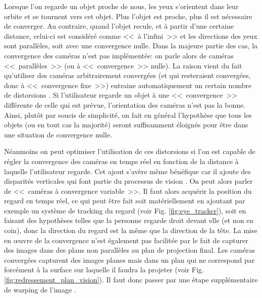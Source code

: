 	\par Lorsque l'on regarde un objet proche de nous, les yeux s'orientent dans leur orbite et se tournent vers cet objet. Plus l'objet est proche, plus il est nécessaire de converger. Au contraire, quand l'objet recule, et à partir d'une certaine distance, celui-ci est considéré comme <<~à l'infini~>> et les directions des yeux sont parallèles, soit avec une convergence nulle. Dans la majeure partie des cas, la convergence des caméras n'est pas implémentée: on parle alors de caméras <<~parallèles~>> (ou à <<~convergence~>> nulle). La raison vient du fait qu'utiliser des caméras arbitrairement convergées (et qui resteraient convergées, donc à <<~convergence fixe~>>) entraine automatiquement un certain nombre de distorsions \citep{woods_image_1993}. Si l'utilisateur regarde un objet à une <<~convergence~>> différente de celle qui est prévue, l'orientation des caméras n'est pas la bonne. Ainsi, plutôt par soucis de simplicité, on fait en général l'hypothèse que tous les objets (ou en tout cas la majorité) seront suffisamment éloignés pour être dans une situation de convergence nulle.
	
	\par Néanmoins on peut optimiser l'utilisation de ces distorsions si l'on est capable de régler la convergence des caméras en temps réel en fonction de la distance à laquelle l'utilisateur regarde. Cet ajout s'avère même bénéfique car il ajoute des disparités verticales qui font partie du processus de vision \citep{aurat_immersion_2016}. On peut alors parler de <<~caméras à convergence variable~>>. Il faut alors acquérir la position du regard en temps réel, ce qui peut être fait soit matériellement en ajoutant par exemple un système de tracking du regard (voir Fig. \ref{fig:eye_tracker}), soit en faisant des hypothèses telles que la personne regarde droit devant elle (et non en coin), donc la direction du regard est la même que la direction de la tête. La mise en œuvre de la convergence n'est également pas facilitée par le fait de capturer des images dans des plans non parallèles au plan de projection final. Les caméras convergées capturent des images planes mais dans un plan qui ne correspond par forcément à la surface sur laquelle il faudra la projeter (voir Fig. \ref{fig:redressement_plan_vision}). Il faut donc passer par une étape supplémentaire de warping de l'image \citep{aurat_immersion_2016}.
	
